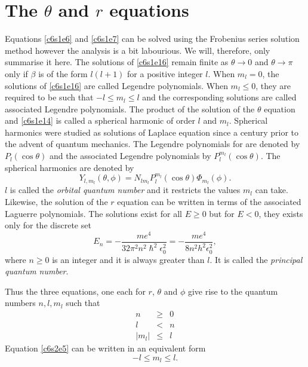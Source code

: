 \section{The $\theta$ and $r$ equations}\label{c6s2}
Equations \eqref{c6s1e6} and \eqref{c6s1e7} can be solved using the Frobenius
series solution method however the analysis is a bit labourious. We will,
therefore, only summarise it here. The solutions of \eqref{c6s1e16} remain 
finite as $\theta \rightarrow 0$ and $\theta \rightarrow \pi$ only if $\beta$
is of the form $l(l+1)$ for a positive integer $l$. When $m_l = 0$, the 
solutions of \eqref{c6s1e16} are called Legendre polynomials. When $m_l \le 0$,
they are required to be such that $-l \le m_l \le l$ and the corresponding
solutions are called associated Legendre polynomials. The product of the 
solution of the $\theta$ equation and \eqref{c6s1e14} is called a spherical
harmonic of order $l$ and $m_l$. Spherical harmonics were studied as solutions
of Laplace equation since a century prior to the advent of quantum mechanics.
The Legendre polynomials for are denoted by $P_l(\cos\theta)$ and the associated
Legendre polynomials by $P_l^{m_l}(\cos\theta)$. The spherical harmonics are
denoted by
\begin{equation}\label{c6s1e18}
Y_{l, m_l}(\theta, \phi) = N_{lm_l}P_l^{m_l}(\cos\theta)\Phi_{m_l}(\phi).
\end{equation}
$l$ is called the \emph{orbital quantum number} and it restricts the values 
$m_l$ can take. Likewise, the solution of the $r$ equation can be written in 
terms of the associated Laguerre polynomials. The solutions exist for all 
$E \ge 0$ but for $E < 0$, they exists only for the discrete set
\begin{equation}\label{c6s1e19}
E_n = -\frac{me^4}{32\pi^2 n^2\hslash^2\epsilon_0^2} = 
-\frac{me^4}{8n^2h^2\epsilon_0^2},
\end{equation}
where $n \ge 0$ is an integer and it is always greater than $l$. It is called
the \emph{principal quantum number}.

Thus the three equations, one each for $r$, $\theta$ and $\phi$ give rise to the
quantum numbers $n, l, m_l$ such that
\begin{eqnarray}
n &\ge& 0 \label{c6s2e3} \\
l &<& n \label{c6s2e4} \\
|m_l| &\le& l \label{c6s2e5}
\end{eqnarray}
Equation \eqref{c6s2e5} can be written in an equivalent form
\begin{equation}\label{c6s2e6}
-l \le m_l \le l.
\end{equation}

